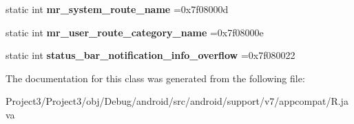 \begin{DoxyCompactItemize}
static int {\bfseries mr\+\_\+system\+\_\+route\+\_\+name} =0x7f08000d
\item 
\mbox{\label{classandroid_1_1support_1_1v7_1_1appcompat_1_1R_1_1string_a7728d7609366266156b4ded818824536}} 
static int {\bfseries mr\+\_\+user\+\_\+route\+\_\+category\+\_\+name} =0x7f08000e
\item 
\mbox{\label{classandroid_1_1support_1_1v7_1_1appcompat_1_1R_1_1string_ae2e1e67bdb6468fd04728d18c9b882f3}} 
static int {\bfseries status\+\_\+bar\+\_\+notification\+\_\+info\+\_\+overflow} =0x7f080022
\end{DoxyCompactItemize}


The documentation for this class was generated from the following file\+:\begin{DoxyCompactItemize}
\item 
Project3/\+Project3/obj/\+Debug/android/src/android/support/v7/appcompat/R.\+java\end{DoxyCompactItemize}
